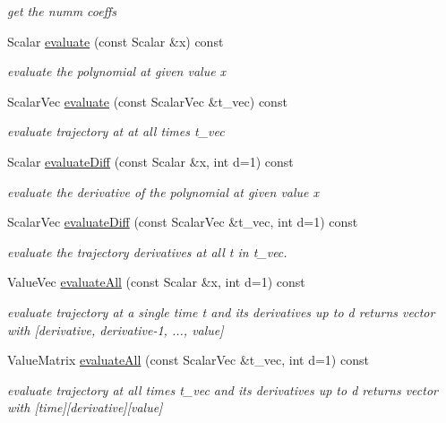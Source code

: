 \begin{DoxyCompactItemize}
\begin{DoxyCompactList}\small\item\em get the numm coeffs \end{DoxyCompactList}\item 
Scalar \hyperlink{classow__core_1_1Polynomial_aa6e91e74ba0e3c733d1aa56ec5668bb5}{evaluate} (const Scalar \&x) const 
\begin{DoxyCompactList}\small\item\em evaluate the polynomial at given value x \end{DoxyCompactList}\item 
Scalar\+Vec \hyperlink{classow__core_1_1Polynomial_aaab249a91693f5d9f010d384158bcf62}{evaluate} (const Scalar\+Vec \&t\+\_\+vec) const 
\begin{DoxyCompactList}\small\item\em evaluate trajectory at at all times t\+\_\+vec \end{DoxyCompactList}\item 
Scalar \hyperlink{classow__core_1_1Polynomial_a45441fd1fb27ec047fa3d9102573b9c3}{evaluate\+Diff} (const Scalar \&x, int d=1) const 
\begin{DoxyCompactList}\small\item\em evaluate the derivative of the polynomial at given value x \end{DoxyCompactList}\item 
Scalar\+Vec \hyperlink{classow__core_1_1Polynomial_a512ad8ba3c489f8735753d0ca0f29c7f}{evaluate\+Diff} (const Scalar\+Vec \&t\+\_\+vec, int d=1) const 
\begin{DoxyCompactList}\small\item\em evaluate the trajectory derivatives at all t in t\+\_\+vec. \end{DoxyCompactList}\item 
Value\+Vec \hyperlink{classow__core_1_1Polynomial_ad3c597d069603a9c2a724ab7bb4d1477}{evaluate\+All} (const Scalar \&x, int d=1) const \hypertarget{classow__core_1_1Polynomial_ad3c597d069603a9c2a724ab7bb4d1477}{}\label{classow__core_1_1Polynomial_ad3c597d069603a9c2a724ab7bb4d1477}

\begin{DoxyCompactList}\small\item\em evaluate trajectory at a single time t and its derivatives up to d returns vector with \mbox{[}derivative, derivative-\/1, ..., value\mbox{]} \end{DoxyCompactList}\item 
Value\+Matrix \hyperlink{classow__core_1_1Polynomial_aa39ddf593cd405caad20aedaa151c900}{evaluate\+All} (const Scalar\+Vec \&t\+\_\+vec, int d=1) const \hypertarget{classow__core_1_1Polynomial_aa39ddf593cd405caad20aedaa151c900}{}\label{classow__core_1_1Polynomial_aa39ddf593cd405caad20aedaa151c900}

\begin{DoxyCompactList}\small\item\em evaluate trajectory at all times t\+\_\+vec and its derivatives up to d returns vector with \mbox{[}time\mbox{]}\mbox{[}derivative\mbox{]}\mbox{[}value\mbox{]} \end{DoxyCompactList}\end{DoxyCompactItemize}
